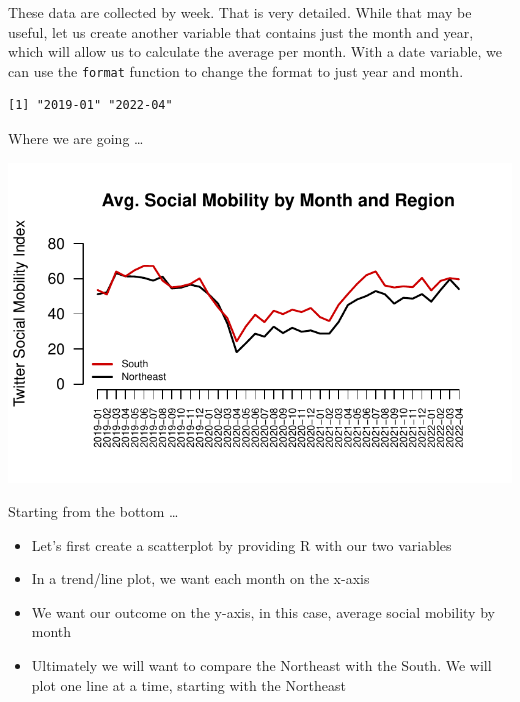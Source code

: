 \documentclass[
  letterpaper,
  DIV=11,
  numbers=noendperiod]{scrreprt}
\newenvironment{Shaded}{\begin{snugshade}}{\end{snugshade}}
\newcommand{\FunctionTok}[1]{\textcolor[rgb]{0.28,0.35,0.67}{#1}}
\newcommand{\NormalTok}[1]{\textcolor[rgb]{0.00,0.23,0.31}{#1}}
\newcommand{\OtherTok}[1]{\textcolor[rgb]{0.00,0.23,0.31}{#1}}
\newcommand{\SpecialCharTok}[1]{\textcolor[rgb]{0.37,0.37,0.37}{#1}}
\newcommand{\StringTok}[1]{\textcolor[rgb]{0.13,0.47,0.30}{#1}}
\providecommand{\tightlist}{%
  \setlength{\itemsep}{0pt}\setlength{\parskip}{0pt}}\usepackage{longtable,booktabs,array}
\begin{document}
These data are collected by week. That is very detailed. While that may
be useful, let us create another variable that contains just the month
and year, which will allow us to calculate the average per month. With a
date variable, we can use the \texttt{format} function to change the
format to just year and month.

\begin{Shaded}
\end{Shaded}

\begin{verbatim}
[1] "2019-01" "2022-04"
\end{verbatim}

Where we are going \ldots{}

\includegraphics{04-Visualization_files/figure-pdf/unnamed-chunk-33-1.pdf}

Starting from the bottom \ldots{}

\begin{itemize}
\tightlist
\item
  Let's first create a scatterplot by providing R with our two variables
\item
  In a trend/line plot, we want each month on the x-axis
\item
  We want our outcome on the y-axis, in this case, average social
  mobility by month
\item
  Ultimately we will want to compare the Northeast with the South. We
  will plot one line at a time, starting with the Northeast
\end{itemize}
\end{document}
